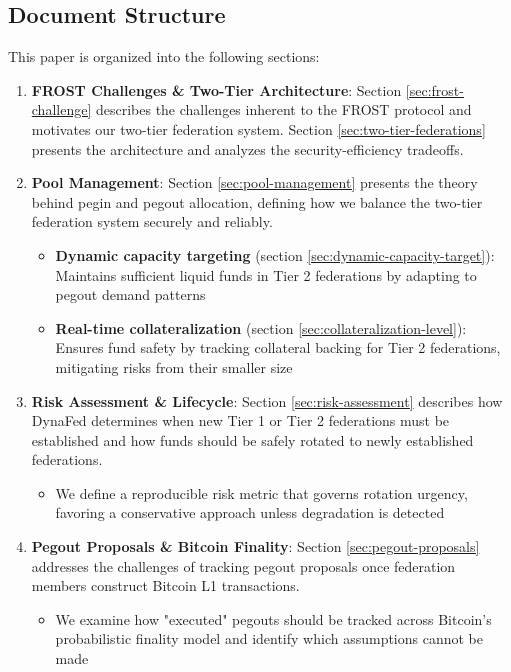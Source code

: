 \subsection{Document Structure}

This paper is organized into the following sections:

\begin{enumerate}
    \item \textbf{FROST Challenges \& Two-Tier Architecture}: Section \ref{sec:frost-challenge} describes the challenges inherent to the FROST protocol and motivates our two-tier federation system. Section \ref{sec:two-tier-federations} presents the architecture and analyzes the security-efficiency tradeoffs.
    \item \textbf{Pool Management}: Section \ref{sec:pool-management} presents the theory behind pegin and pegout allocation, defining how we balance the two-tier federation system securely and reliably.
          \begin{itemize}
              \item \textbf{Dynamic capacity targeting} (section \ref{sec:dynamic-capacity-target}): Maintains sufficient liquid funds in Tier 2 federations by adapting to pegout demand patterns
              \item \textbf{Real-time collateralization} (section \ref{sec:collateralization-level}): Ensures fund safety by tracking collateral backing for Tier 2 federations, mitigating risks from their smaller size
          \end{itemize}
    \item \textbf{Risk Assessment \& Lifecycle}: Section \ref{sec:risk-assessment} describes how DynaFed determines when new Tier 1 or Tier 2 federations must be established and how funds should be safely rotated to newly established federations.
          \begin{itemize}
              \item We define a reproducible risk metric that governs rotation urgency, favoring a conservative approach unless degradation is detected
          \end{itemize}
    \item \textbf{Pegout Proposals \& Bitcoin Finality}: Section \ref{sec:pegout-proposals} addresses the challenges of tracking pegout proposals once federation members construct Bitcoin L1 transactions.
          \begin{itemize}
              \item We examine how "executed" pegouts should be tracked across Bitcoin's probabilistic finality model and identify which assumptions cannot be made

\end{itemize}
\end{enumerate}
